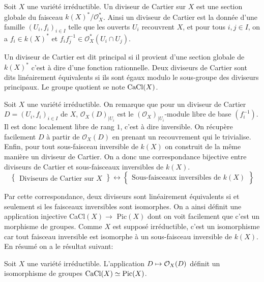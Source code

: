 \begin{defn}
Soit $X$ une variété irréductible. Un diviseur de Cartier sur $X$ est une section globale du faisceau $k(X)^*/\mathcal{O}_X^*$. Ainsi un diviseur de Cartier est la donnée d'une famille $(U_i, f_i)_{i\in I}$ telle que les ouverts $U_i$ recouvrent $X$, et pour tous $i,j \in I$, on a $f_i\in k(X)^*$ et $f_if_j^{-1}\in \mathcal{O}_X^*(U_i\cap U_j)$.

Un diviseur de Cartier est dit principal si il provient d'une section globale de $k(X)^*$ c'est à dire d'une fonction rationnelle. Deux diviseurs de Cartier sont dits linéairement équivalents si ils sont égaux modulo le sous-groupe des diviseurs principaux. Le groupe quotient se note $\operatorname{CaCl}(X)$.
\end{defn}





Soit $X$ une variété irréductible. On remarque que pour un diviseur de Cartier $D=(U_i, f_i)_{i\in I}$ de $X$, $\mathcal{O}_X(D)_{|U_i}$ est le $(\mathcal{O}_X)_{|U_i}$-module libre de base $(f_i^{-1})$. Il est donc localement libre de rang $1$, c'est à dire inversible. On récupère facilement $D$ à partir de $\mathcal{O}_X(D)$ en prenant un recouvrement qui le trivialise. Enfin, pour tout sous-faisceau inversible de $k(X)$ on construit de la même manière un diviseur de Cartier. On a donc une correspondance bijective entre diviseurs de Cartier et sous-faisceaux inversibles de $k(X)$. 
$$
\left\{
\begin{matrix}
\text{Diviseurs de Cartier sur }X
\end{matrix}
\right\}
\leftrightarrow
\left\{
\begin{matrix}
\text{Sous-faisceaux inversibles de } k(X)
\end{matrix}
\right\}
$$

Par cette correspondance, deux diviseurs sont linéairement équivalents si et seulement si les faisceaux inversibles sont isomorphes. On a ainsi définit une application injective CaCl$(X)\rightarrow$ Pic$(X)$ dont on voit facilement que c'est un morphisme de groupes. Comme $X$ est supposé irréductible, c'est un isomorphisme car tout faisceau inversible est isomorphe à un sous-faisceau inversible de $k(X)$. En résumé on a le résultat suivant:


\begin{prop}\label{isopic}
Soit $X$ une variété irréductible. L'application $D\mapsto \mathcal{O}_X(D)$ définit un isomorphisme de groupes $\operatorname{CaCl}(X)\simeq \operatorname{Pic}(X)$.
\end{prop}


